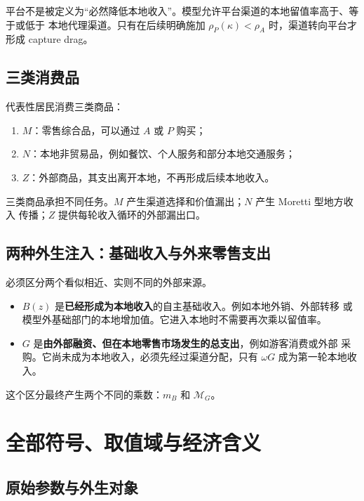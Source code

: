\documentclass[UTF8,11pt,scheme=chinese,fontset=fandol]{ctexart}
\theoremstyle{definition}
\begin{document}
平台不是被定义为“必然降低本地收入”。模型允许平台渠道的本地留值率高于、等于或低于
本地代理渠道。只有在后续明确施加 \(\rho_P(\kappa)<\rho_A\) 时，渠道转向平台才形成
capture drag。

\subsection{三类消费品}

代表性居民消费三类商品：

\begin{enumerate}
  \item \(M\)：零售综合品，可以通过 \(A\) 或 \(P\) 购买；
  \item \(N\)：本地非贸易品，例如餐饮、个人服务和部分本地交通服务；
  \item \(Z\)：外部商品，其支出离开本地，不再形成后续本地收入。
\end{enumerate}

三类商品承担不同任务。\(M\) 产生渠道选择和价值漏出；\(N\) 产生 Moretti 型地方收入
传播；\(Z\) 提供每轮收入循环的外部漏出口。

\subsection{两种外生注入：基础收入与外来零售支出}

必须区分两个看似相近、实则不同的外部来源。

\begin{itemize}
  \item \(B(z)\) 是\textbf{已经形成为本地收入}的自主基础收入。例如本地外销、外部转移
  或模型外基础部门的本地增加值。它进入本地时不需要再次乘以留值率。
  \item \(G\) 是\textbf{由外部融资、但在本地零售市场发生的总支出}，例如游客消费或外部
  采购。它尚未成为本地收入，必须先经过渠道分配，只有 \(\omega G\) 成为第一轮本地收入。
\end{itemize}

这个区分最终产生两个不同的乘数：\(m_B\) 和 \(\mathcal M_G\)。

\section{全部符号、取值域与经济含义}

\subsection{原始参数与外生对象}
\end{document}
